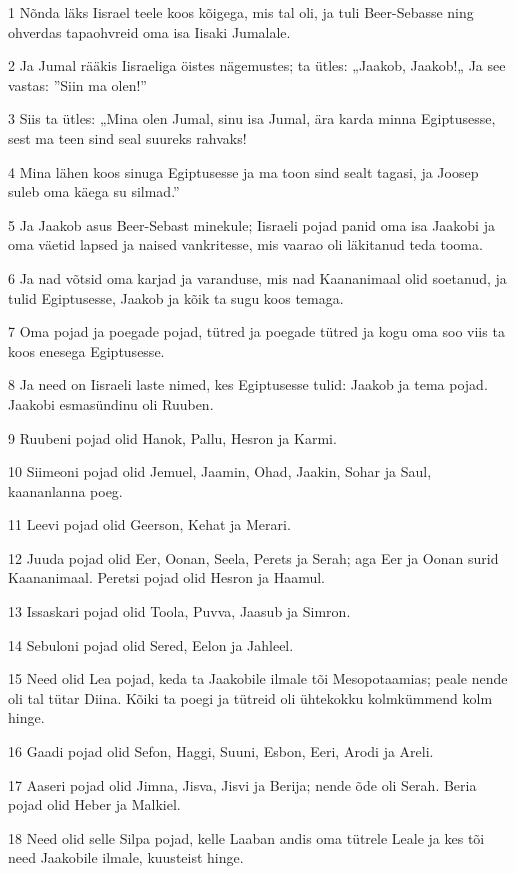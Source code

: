 \par 1 Nõnda läks Iisrael teele koos kõigega, mis tal oli, ja tuli Beer-Sebasse ning ohverdas tapaohvreid oma isa Iisaki Jumalale.
\par 2 Ja Jumal rääkis Iisraeliga öistes nägemustes; ta ütles: „Jaakob, Jaakob!„ Ja see vastas: ”Siin ma olen!”
\par 3 Siis ta ütles: „Mina olen Jumal, sinu isa Jumal, ära karda minna Egiptusesse, sest ma teen sind seal suureks rahvaks!
\par 4 Mina lähen koos sinuga Egiptusesse ja ma toon sind sealt tagasi, ja Joosep suleb oma käega su silmad.”
\par 5 Ja Jaakob asus Beer-Sebast minekule; Iisraeli pojad panid oma isa Jaakobi ja oma väetid lapsed ja naised vankritesse, mis vaarao oli läkitanud teda tooma.
\par 6 Ja nad võtsid oma karjad ja varanduse, mis nad Kaananimaal olid soetanud, ja tulid Egiptusesse, Jaakob ja kõik ta sugu koos temaga.
\par 7 Oma pojad ja poegade pojad, tütred ja poegade tütred ja kogu oma soo viis ta koos enesega Egiptusesse.
\par 8 Ja need on Iisraeli laste nimed, kes Egiptusesse tulid: Jaakob ja tema pojad. Jaakobi esmasündinu oli Ruuben.
\par 9 Ruubeni pojad olid Hanok, Pallu, Hesron ja Karmi.
\par 10 Siimeoni pojad olid Jemuel, Jaamin, Ohad, Jaakin, Sohar ja Saul, kaananlanna poeg.
\par 11 Leevi pojad olid Geerson, Kehat ja Merari.
\par 12 Juuda pojad olid Eer, Oonan, Seela, Perets ja Serah; aga Eer ja Oonan surid Kaananimaal. Peretsi pojad olid Hesron ja Haamul.
\par 13 Issaskari pojad olid Toola, Puvva, Jaasub ja Simron.
\par 14 Sebuloni pojad olid Sered, Eelon ja Jahleel.
\par 15 Need olid Lea pojad, keda ta Jaakobile ilmale tõi Mesopotaamias; peale nende oli tal tütar Diina. Kõiki ta poegi ja tütreid oli ühtekokku kolmkümmend kolm hinge.
\par 16 Gaadi pojad olid Sefon, Haggi, Suuni, Esbon, Eeri, Arodi ja Areli.
\par 17 Aaseri pojad olid Jimna, Jisva, Jisvi ja Berija; nende õde oli Serah. Beria pojad olid Heber ja Malkiel.
\par 18 Need olid selle Silpa pojad, kelle Laaban andis oma tütrele Leale ja kes tõi need Jaakobile ilmale, kuusteist hinge.
